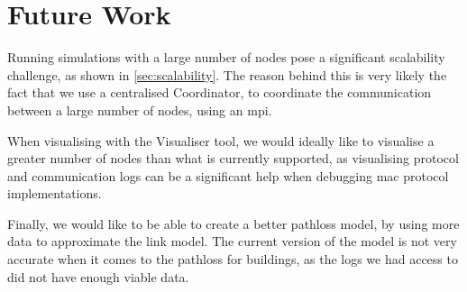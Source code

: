 
\section{Future Work}
Running simulations with a large number of nodes pose a significant scalability challenge, as shown in
\autoref{sec:scalability}. The reason behind this is very likely the fact that we use a centralised
Coordinator, to coordinate the communication between a large number of nodes, using an \gls{mpi}. \medbreak

When visualising with the Visualiser tool, we would ideally like to visualise a greater number of nodes than
what is currently supported, as visualising protocol and communication logs can be a significant help when
debugging \gls{mac} protocol implementations. \medbreak

Finally, we would like to be able to create a better \gls{pathloss} model, by using more data to approximate
the link model. The current version of the model is not very accurate when it comes to the \gls{pathloss} for
buildings, as the logs we had access to did not have enough viable data.



